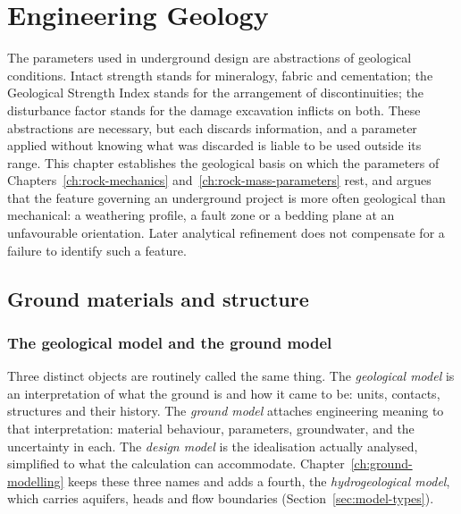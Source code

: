 \chapter{Engineering Geology}
\label{ch:engineering-geology}

The parameters used in underground design are abstractions of geological
conditions. Intact strength stands for mineralogy, fabric and cementation; the
Geological Strength Index stands for the arrangement of discontinuities; the
disturbance factor stands for the damage excavation inflicts on both. These
abstractions are necessary, but each discards information, and a parameter
applied without knowing what was discarded is liable to be used outside its
range. This chapter establishes the geological basis on which the
parameters of Chapters~\ref{ch:rock-mechanics}
and~\ref{ch:rock-mass-parameters} rest, and argues that the feature governing
an underground project is more often geological than mechanical: a weathering
profile, a fault zone or a bedding plane at an unfavourable orientation. Later
analytical refinement does not compensate for a failure to identify such a
feature.

\section{Ground materials and structure}
\label{sec:ground-materials}

\subsection{The geological model and the ground model}
\label{sec:ground-model}

Three distinct objects are routinely called the same thing. The
\emph{geological model} is an interpretation of what the ground is and how it
came to be: units, contacts, structures and their history. The \emph{ground
model} attaches engineering meaning to that interpretation: material
behaviour, parameters, groundwater, and the uncertainty in each. The
\emph{design model} is the idealisation actually analysed, simplified to what
the calculation can accommodate. Chapter~\ref{ch:ground-modelling} keeps
these three names and adds a fourth, the \emph{hydrogeological model}, which
carries aquifers, heads and flow boundaries (Section~\ref{sec:model-types}).

